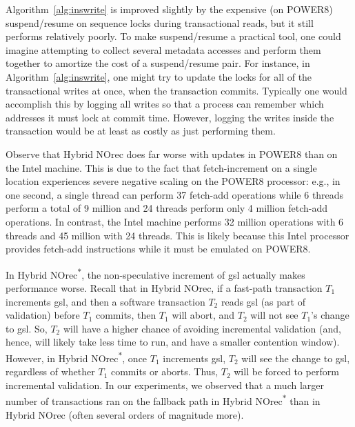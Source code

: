 Algorithm~\ref{alg:inswrite} is improved slightly by the expensive (on POWER8) suspend/resume on sequence locks during transactional reads, but it still performs relatively poorly. 
To make suspend/resume a practical tool, one could imagine attempting to 
collect several metadata accesses and perform them together to amortize the cost of a suspend/resume pair. For instance, 
in Algorithm~\ref{alg:inswrite}, one might try to update the locks for all of the transactional writes at once, when the transaction commits. 
Typically one would accomplish this by logging all writes so that a process can remember which addresses it must lock at commit time. 
However, logging the writes inside the transaction would be at least as costly as just performing them.

Observe that Hybrid NOrec does far worse with updates in POWER8 than on the Intel machine.
This is due to the fact that fetch-increment on a single location experiences severe negative scaling on the POWER8 processor: e.g., in one second, a single
thread can perform 37 fetch-add operations while 6 threads perform a total of 9 million and 24 threads perform only 4 million fetch-add operations.
In contrast, the Intel machine performs 32 million operations with 6 threads and 45 million with 24 threads. This is likely because this Intel processor provides fetch-add instructions while it must be emulated on POWER8.

In Hybrid NOrec\textsuperscript{$\ast$}, the non-speculative increment of gsl actually makes performance worse. Recall that in Hybrid NOrec, 
if a fast-path transaction $T_1$ increments gsl, and then a software transaction $T_2$ reads gsl (as part of validation) before $T_1$ commits, then $T_1$ will abort, 
and $T_2$ will not see $T_1$'s change to gsl. 
So, $T_2$ will have a higher chance of avoiding incremental validation (and, hence, will likely take less time to run, and have a smaller contention window).
However, in Hybrid NOrec\textsuperscript{$\ast$}, once $T_1$ increments gsl, $T_2$ will see the change to gsl, regardless of whether $T_1$ commits or aborts. Thus, 
$T_2$ will be forced to perform incremental validation. In our experiments, we observed that a much larger number of transactions ran on 
the fallback path in Hybrid NOrec\textsuperscript{$\ast$} than in Hybrid NOrec (often several orders of magnitude more).
